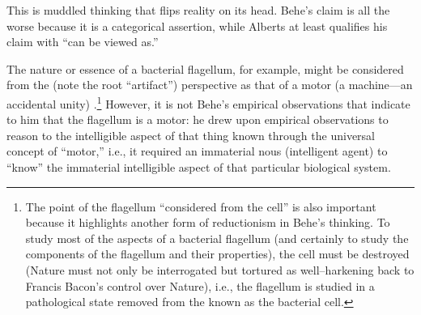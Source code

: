 This is muddled thinking that flips reality on its head.  Behe's claim is all the worse because it is a categorical assertion, while Alberts at least qualifies his claim with ``can be viewed as.''

The nature or essence of a bacterial flagellum, for example, might be considered from the  (note the root ``artifact'') perspective as that of a motor (a machine---an accidental unity) .\footnote{The point of the flagellum ``considered  from the cell'' is also important because it highlights another form of reductionism in Behe's thinking. To study most of the aspects of a bacterial flagellum (and certainly to study the components of the flagellum and their properties), the cell must be destroyed (Nature must not only be interrogated but tortured as well--harkening back to Francis Bacon's  control over Nature), i.e., the flagellum is studied in a pathological state removed from the  known as the bacterial cell.} However, it is not Behe's empirical observations that indicate to him that the flagellum is a motor: he drew upon empirical observations to reason to the intelligible aspect of that thing known through the universal concept of ``motor,'' i.e., it required an immaterial nous (intelligent agent) to ``know'' the immaterial intelligible aspect of that particular biological system.

